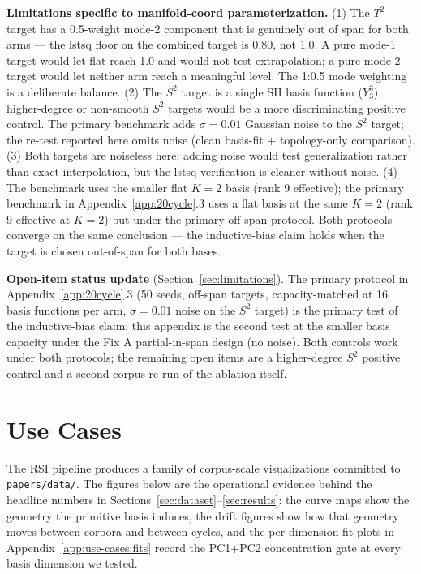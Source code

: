 \documentclass[11pt,a4paper]{article}
\theoremstyle{plain}
\theoremstyle{remark}
\theoremstyle{plain}
\begin{document}
\textbf{Limitations specific to manifold-coord parameterization.} (1) The $T^2$ target has a 0.5-weight mode-2 component that is genuinely out of span for both arms --- the lstsq floor on the combined target is 0.80, not 1.0. A pure mode-1 target would let flat reach 1.0 and would not test extrapolation; a pure mode-2 target would let neither arm reach a meaningful level. The 1:0.5 mode weighting is a deliberate balance. (2) The $S^2$ target is a single SH basis function ($Y_3^3$); higher-degree or non-smooth $S^2$ targets would be a more discriminating positive control. The primary benchmark adds $\sigma = 0.01$ Gaussian noise to the $S^2$ target; the re-test reported here omits noise (clean basis-fit + topology-only comparison). (3) Both targets are noiseless here; adding noise would test generalization rather than exact interpolation, but the lstsq verification is cleaner without noise. (4) The benchmark uses the smaller flat $K{=}2$ basis (rank 9 effective); the primary benchmark in Appendix~\ref{app:20cycle}.3 uses a flat basis at the same $K{=}2$ (rank 9 effective at $K{=}2$) but under the primary off-span protocol. Both protocols converge on the same conclusion --- the inductive-bias claim holds when the target is chosen out-of-span for both bases.

\textbf{Open-item status update} (Section~\ref{sec:limitations}). The primary protocol in Appendix~\ref{app:20cycle}.3 (50 seeds, off-span targets, capacity-matched at 16 basis functions per arm, $\sigma = 0.01$ noise on the $S^2$ target) is the primary test of the inductive-bias claim; this appendix is the second test at the smaller basis capacity under the Fix A partial-in-span design (no noise). Both controls work under both protocols; the remaining open items are a higher-degree $S^2$ positive control and a second-corpus re-run of the ablation itself.


\section{Use Cases}\label{app:use-cases}
The RSI pipeline produces a family of corpus-scale visualizations committed to \texttt{papers/data/}. The figures below are the operational evidence behind the headline numbers in Sections~\ref{sec:dataset}--\ref{sec:results}: the curve maps show the geometry the primitive basis induces, the drift figures show how that geometry moves between corpora and between cycles, and the per-dimension fit plots in Appendix~\ref{app:use-cases:fits} record the PC1+PC2 concentration gate at every basis dimension we tested.
\end{document}
